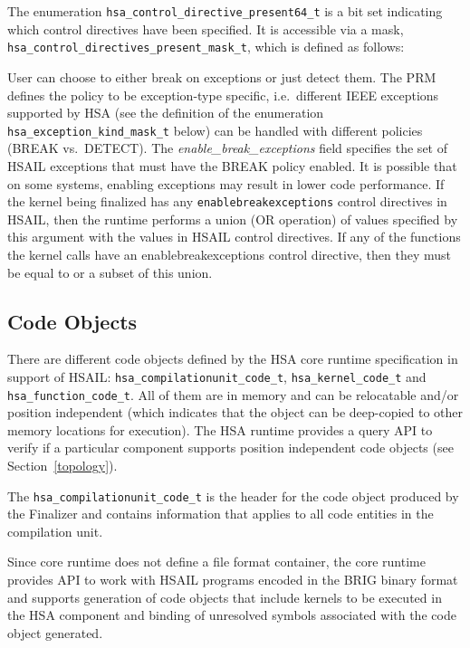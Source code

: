 The enumeration \texttt{hsa\_control\_directive\_present64\_t} is a
bit set indicating which control directives have been specified. It
is accessible via a mask,
\texttt{hsa\_control\_directives\_present\_mask\_t}, which
is defined as follows:



User can choose to either break on exceptions or just detect them.
The PRM defines the policy to be exception-type specific, i.e.\ different
IEEE exceptions supported by HSA (see the definition of the
enumeration \texttt{hsa\_exception\_kind\_mask\_t} below)  can be
handled with different policies (BREAK vs.\ DETECT).
The {\itshape enable\_break\_exceptions} field specifies the set of
HSAIL exceptions that must have the BREAK policy enabled. It is
possible that on some systems, enabling exceptions may result in
lower code performance.
If the kernel being finalized has any \texttt{enablebreakexceptions}
control directives in HSAIL, then the runtime performs a union (OR
operation) of values specified by this argument with the values in
HSAIL control directives. If any of the functions the kernel calls
have an enablebreakexceptions control directive, then they must be
equal to or a subset of this union.



\subsection{Code Objects}\label{finalize:codeobject}

There are different code objects defined by the HSA core runtime
specification in support of HSAIL:
\texttt{hsa\_compilationunit\_code\_t},
\texttt{hsa\_kernel\_code\_t} and \texttt{hsa\_function\_code\_t}.
All of them are in memory and can be relocatable and/or position
independent (which indicates that the object can be deep-copied to
other memory locations for execution). The HSA runtime provides a
query API to verify if a particular component supports position
independent code objects (see Section~\ref{topology}).

The \texttt{hsa\_compilationunit\_code\_t} is the header for the
code object produced by the Finalizer and contains information that
applies to all code entities in the compilation unit.

Since core runtime does not define a file format container, the core
runtime provides API to work with HSAIL programs encoded in the BRIG
binary format and supports generation of code objects that
include kernels to be executed in the HSA component and binding
of unresolved symbols associated with the code object
generated.

